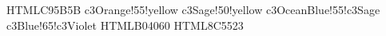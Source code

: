 \documentclass{llmxive}
\begin{document}
\definecolor{c3Coral} {HTML}{C95B5B}%
   {c3Orange!55!yellow}%
  {c3Sage!50!yellow}%
   {c3OceanBlue!55!c3Sage}%
 {c3Blue!65!c3Violet}%
\definecolor{c3Berry} {HTML}{B04060}%
\definecolor{c3Cocoa} {HTML}{8C5523}%
%
\end{document}
